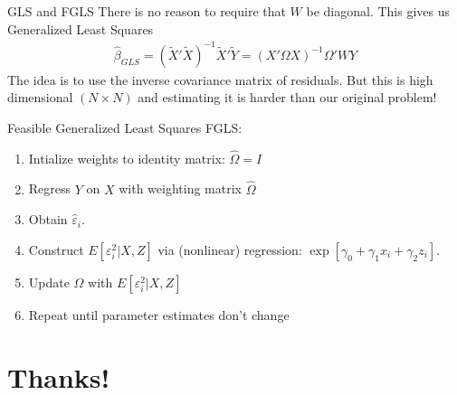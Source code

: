 \documentclass[aspectratio=169]{beamer}
\begin{document}
\begin{frame}{GLS and FGLS}
There is no reason to require that $W$ be diagonal. This gives us \alert{Generalized Least Squares}
\begin{align*}
\widehat{\beta}_{GLS} = (\tilde{X}'\tilde{X})^{-1}\tilde{X}'\tilde{Y} = (X' \Omega  X)^{-1} \Omega' W Y
\end{align*}
The idea is to use the \alert{inverse covariance matrix} of residuals. But this is high dimensional $(N \times N)$ and estimating it is harder than our original problem!

 Feasible Generalized Least Squares \alert{FGLS}:
\begin{enumerate}
\item Intialize weights to identity matrix: $\widehat{\Omega}= I$
\item Regress $Y$ on $X$ with weighting matrix $\widehat{\Omega}$
\item Obtain $\widehat{\varepsilon}_i$.
\item Construct $E[ \varepsilon_i^2 | X, Z]$ via (nonlinear) regression: $\exp[ \gamma_0 + \gamma_1 x_{i} + \gamma_2 z_{i}]$.
\item Update $\widehat{\Omega}$ with $E[ \varepsilon_i^2 | X, Z]$
\item Repeat until parameter estimates don't change
\end{enumerate}
\end{frame}


\section*{Thanks!}
\end{document}
